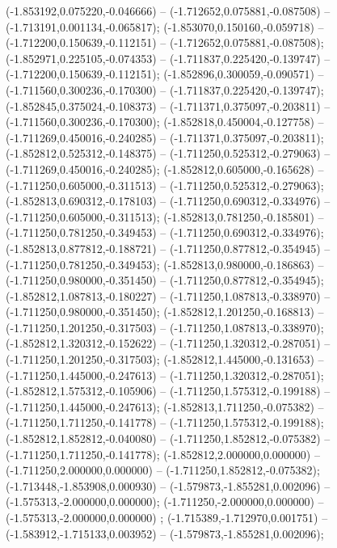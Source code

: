  (-1.853192,0.075220,-0.046666) -- (-1.712652,0.075881,-0.087508) -- (-1.713191,0.001134,-0.065817);
 (-1.853070,0.150160,-0.059718) -- (-1.712200,0.150639,-0.112151) -- (-1.712652,0.075881,-0.087508);
 (-1.852971,0.225105,-0.074353) -- (-1.711837,0.225420,-0.139747) -- (-1.712200,0.150639,-0.112151);
 (-1.852896,0.300059,-0.090571) -- (-1.711560,0.300236,-0.170300) -- (-1.711837,0.225420,-0.139747);
 (-1.852845,0.375024,-0.108373) -- (-1.711371,0.375097,-0.203811) -- (-1.711560,0.300236,-0.170300);
 (-1.852818,0.450004,-0.127758) -- (-1.711269,0.450016,-0.240285) -- (-1.711371,0.375097,-0.203811);
 (-1.852812,0.525312,-0.148375) -- (-1.711250,0.525312,-0.279063) -- (-1.711269,0.450016,-0.240285);
 (-1.852812,0.605000,-0.165628) -- (-1.711250,0.605000,-0.311513) -- (-1.711250,0.525312,-0.279063);
 (-1.852813,0.690312,-0.178103) -- (-1.711250,0.690312,-0.334976) -- (-1.711250,0.605000,-0.311513);
 (-1.852813,0.781250,-0.185801) -- (-1.711250,0.781250,-0.349453) -- (-1.711250,0.690312,-0.334976);
 (-1.852813,0.877812,-0.188721) -- (-1.711250,0.877812,-0.354945) -- (-1.711250,0.781250,-0.349453);
 (-1.852813,0.980000,-0.186863) -- (-1.711250,0.980000,-0.351450) -- (-1.711250,0.877812,-0.354945);
 (-1.852812,1.087813,-0.180227) -- (-1.711250,1.087813,-0.338970) -- (-1.711250,0.980000,-0.351450);
 (-1.852812,1.201250,-0.168813) -- (-1.711250,1.201250,-0.317503) -- (-1.711250,1.087813,-0.338970);
 (-1.852812,1.320312,-0.152622) -- (-1.711250,1.320312,-0.287051) -- (-1.711250,1.201250,-0.317503);
 (-1.852812,1.445000,-0.131653) -- (-1.711250,1.445000,-0.247613) -- (-1.711250,1.320312,-0.287051);
 (-1.852812,1.575312,-0.105906) -- (-1.711250,1.575312,-0.199188) -- (-1.711250,1.445000,-0.247613);
 (-1.852813,1.711250,-0.075382) -- (-1.711250,1.711250,-0.141778) -- (-1.711250,1.575312,-0.199188);
 (-1.852812,1.852812,-0.040080) -- (-1.711250,1.852812,-0.075382) -- (-1.711250,1.711250,-0.141778);
 (-1.852812,2.000000,0.000000) -- (-1.711250,2.000000,0.000000) -- (-1.711250,1.852812,-0.075382);
 (-1.713448,-1.853908,0.000930) -- (-1.579873,-1.855281,0.002096) -- (-1.575313,-2.000000,0.000000);
 (-1.711250,-2.000000,0.000000) -- (-1.575313,-2.000000,0.000000) ;
 (-1.715389,-1.712970,0.001751) -- (-1.583912,-1.715133,0.003952) -- (-1.579873,-1.855281,0.002096);

